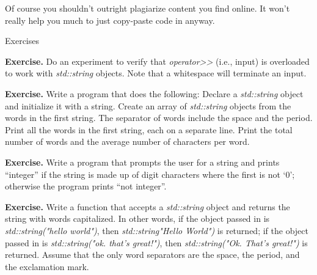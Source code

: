 \documentclass[
]{article}
\begin{document}
Of course you shouldn't outright plagiarize content you find online. It
won't really help you much to just copy-paste code in anyway.

Exercises

\textbf{Exercise. }Do an experiment to verify that
\emph{operator\textgreater\textgreater{}} (i.e., input) is overloaded to
work with \emph{std::string} objects. Note that a whitespace will
terminate an input.

\textbf{Exercise. }Write a program that does the following: Declare a
\emph{std::string} object and initialize it with a string. Create an
array of \emph{std::string} objects from the words in the first string.
The separator of words include the space and the period. Print all the
words in the first string, each on a separate line. Print the total
number of words and the average number of characters per word.

\textbf{Exercise.} Write a program that prompts the user for a string
and prints ``integer'' if the string is made up of digit characters
where the first is not `0'; otherwise the program prints ``not
integer''.

\textbf{Exercise.} Write a function that accepts a \emph{std::string}
object and returns the string with words capitalized. In other words, if
the object passed in is \emph{std::string("hello world")}, then
\emph{std::string"Hello World")} is returned; if the object passed in is
\emph{std::string("ok. that's great!")}, then \emph{std::string("Ok.
That's great!")} is returned. Assume that the only word separators are
the space, the period, and the exclamation mark.
\end{document}
